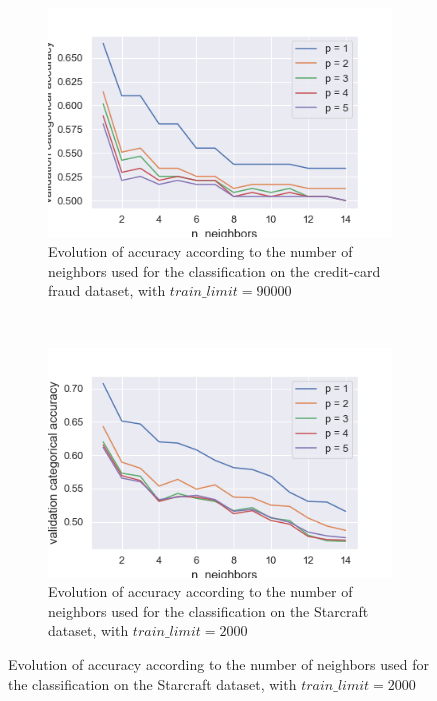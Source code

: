 \documentclass[10pt]{article}
\begin{document}
		\begin{figure}
			\centering
			\begin{subfigure}[]{0.45\columnwidth}
				\centering
				\includegraphics[width=\linewidth]{../graphics/knn_creditcard_neighbors.png}
				\caption{Evolution of accuracy according to the number of neighbors used for the classification on the credit-card fraud dataset, with $train\_limit=90000$}
				\label{knn:knn_cc_neighbors}
			\end{subfigure}
			~
			\begin{subfigure}[]{0.45\columnwidth}
				\centering
				\includegraphics[width=\linewidth]{../graphics/knn_starcraft_neighbors.png}
				\caption{Evolution of accuracy according to the number of neighbors used for the classification on the Starcraft dataset, with $train\_limit=2000$}
				\label{knn:knn_sc_neighbors}
			\end{subfigure}

\end{figure}
\end{document}
